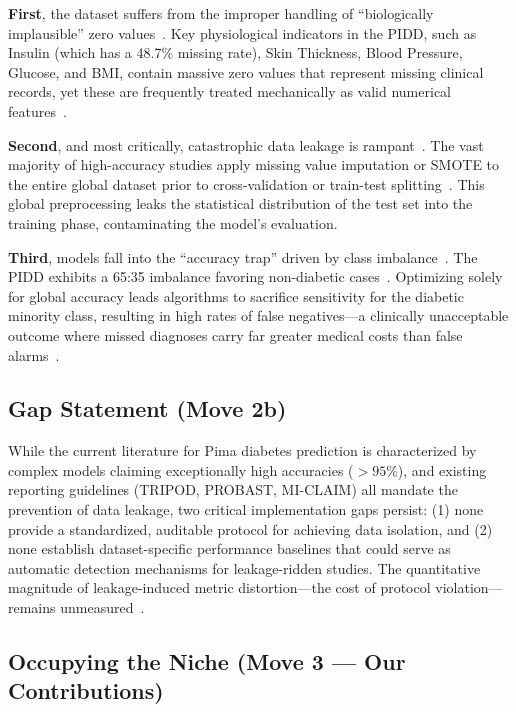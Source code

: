 \documentclass[3p,twocolumn]{elsarticle}
\begin{document}
\textbf{First}, the dataset suffers from the improper handling of ``biologically implausible'' zero values~\cite{KaggleZeroValues}. Key physiological indicators in the PIDD, such as Insulin (which has a 48.7\% missing rate), Skin Thickness, Blood Pressure, Glucose, and BMI, contain massive zero values that represent missing clinical records, yet these are frequently treated mechanically as valid numerical features~\cite{Kapoor2024Leakage}.

\textbf{Second}, and most critically, catastrophic data leakage is rampant~\cite{Wen2024Leakage}. The vast majority of high-accuracy studies apply missing value imputation or SMOTE to the entire global dataset prior to cross-validation or train-test splitting~\cite{Wen2024Leakage}. This global preprocessing leaks the statistical distribution of the test set into the training phase, contaminating the model's evaluation.

\textbf{Third}, models fall into the ``accuracy trap'' driven by class imbalance~\cite{Sali2025, Amri2025}. The PIDD exhibits a 65:35 imbalance favoring non-diabetic cases~\cite{Kapoor2024Leakage}. Optimizing solely for global accuracy leads algorithms to sacrifice sensitivity for the diabetic minority class, resulting in high rates of false negatives---a clinically unacceptable outcome where missed diagnoses carry far greater medical costs than false alarms~\cite{Sali2025}.

\subsection{Gap Statement (Move 2b)}

While the current literature for Pima diabetes prediction is characterized by complex models claiming exceptionally high accuracies ($>95\%$), and existing reporting guidelines (TRIPOD, PROBAST, MI-CLAIM) all mandate the prevention of data leakage, two critical implementation gaps persist: (1) none provide a standardized, auditable protocol for achieving data isolation, and (2) none establish dataset-specific performance baselines that could serve as automatic detection mechanisms for leakage-ridden studies. The quantitative magnitude of leakage-induced metric distortion---the cost of protocol violation---remains unmeasured~\cite{Kapoor2024Leakage}.

\subsection{Occupying the Niche (Move 3 --- Our Contributions)}
\end{document}
